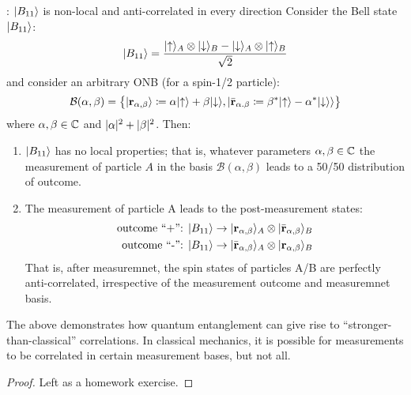 \begin{propbox}{: $\lvert B_{11} \rangle$ is non-local and anti-correlated in every direction}
    Consider the Bell state $\lvert B_{11} \rangle$:
    \begin{equation}
        \lvert B_{11} \rangle = \frac{\lvert \uparrow \rangle_A \otimes \lvert \downarrow \rangle_B - \lvert \downarrow \rangle_A \otimes \lvert \uparrow \rangle_B}{\sqrt{2}}
    \end{equation}
    and consider an arbitrary ONB (for a spin-1/2 particle):
    \begin{equation}
        \mathcal{B}(\alpha, \beta) = \set{\lvert \ensuremath{\mathbf{r}}_{\alpha, \beta} \rangle \coloneqq \alpha\lvert \uparrow \rangle + \beta\lvert \downarrow \rangle, \lvert \bar{\ensuremath{\mathbf{r}}}_{\alpha. \beta} \coloneqq \beta^*\lvert \uparrow \rangle - \alpha^*\lvert \downarrow \rangle \rangle}
    \end{equation}
    where $\alpha, \beta \in \mathbb{C}$ and $\lvert \alpha \rvert^2 + \lvert \beta \rvert^2$. Then:
    \begin{enumerate}
        \item $\lvert B_{11} \rangle$ has no local properties; that is, whatever parameters $\alpha, \beta \in \mathbb{C}$ the measurement of particle $A$ in the basis $\mathcal{B}(\alpha, \beta)$ leads to a 50/50 distribution of outcome.
        \item The measurement of particle A leads to the post-measurement states:
        \begin{equation}
            \begin{split}
                \text{outcome ``+'': } \lvert B_{11} \rangle &\to \lvert \mathbf{r}_{\alpha, \beta} \rangle_A \otimes \lvert \bar{\mathbf{r}}_{\alpha, \beta} \rangle_B
                \\ \text{outcome  ``-'': } \lvert B_{11} \rangle &\to \lvert \bar{\mathbf{r}}_{\alpha, \beta} \rangle_A \otimes \lvert \mathbf{r}_{\alpha, \beta} \rangle_B
            \end{split}
        \end{equation}
        That is, after measuremnet, the spin states of particles A/B are perfectly anti-correlated, irrespective of the measurement outcome and measuremnet basis.
    \end{enumerate} 
\end{propbox}
The above demonstrates how quantum entanglement can give rise to ``stronger-than-classical'' correlations. In classical mechanics, it is possible for measurements to be correlated in certain measurement bases, but not all.

\begin{proof}
    Left as a homework exercise.
\end{proof}

